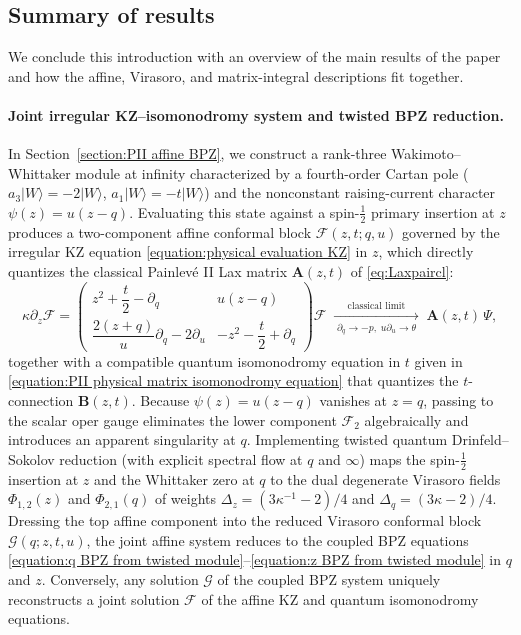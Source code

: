 \documentclass[a4paper,11pt]{article}
\newcommand{\cF}{\mathcal{F}}
\numberwithin{equation}{section}
\begin{document}
\subsection{Summary of results}
\label{subsection:summary_of_results}

We conclude this introduction with an overview of the main results of the paper and how the affine, Virasoro, and matrix-integral descriptions fit together.

\paragraph{Joint irregular KZ--isomonodromy system and twisted BPZ reduction.}
In Section~\ref{section:PII affine BPZ}, we construct a rank-three Wakimoto--Whittaker module at infinity characterized by a fourth-order Cartan pole ($a_{3}|W\rangle=-2|W\rangle$, $a_{1}|W\rangle=-t|W\rangle$) and the nonconstant raising-current character $\psi(z)=u(z-q)$.  Evaluating this state against a spin-$\frac{1}{2}$ primary insertion at $z$ produces a two-component affine conformal block $\cF(z,t;q,u)$ governed by the irregular KZ equation \eqref{equation:physical evaluation KZ} in $z$, which directly quantizes the classical Painlev\'e II Lax matrix $\mathbf{A}(z,t)$ of \eqref{eq:Laxpaircl}:
\begin{equation}
	\kappa\partial_{z}\cF
	=
	\begin{pmatrix}
		z^{2}+\dfrac{t}{2}-\partial_{q} & u(z-q)\\[2mm]
		\dfrac{2(z+q)}{u}\partial_{q}-2\partial_{u} & -z^{2}-\dfrac{t}{2}+\partial_{q}
	\end{pmatrix}\cF
	\;\xrightarrow[\;\partial_{q}\to -p,\; u\partial_{u}\to\theta\;]{\text{classical limit}}\;
	\mathbf{A}(z,t)\,\Psi,
\end{equation}
together with a compatible quantum isomonodromy equation in $t$ given in \eqref{equation:PII physical matrix isomonodromy equation} that quantizes the $t$-connection $\mathbf{B}(z,t)$.
Because $\psi(z)=u(z-q)$ vanishes at $z=q$, passing to the scalar oper gauge eliminates the lower component $\cF_{2}$ algebraically and introduces an apparent singularity at $q$.  Implementing twisted quantum Drinfeld--Sokolov reduction (with explicit spectral flow at $q$ and $\infty$) maps the spin-$\frac{1}{2}$ insertion at $z$ and the Whittaker zero at $q$ to the dual degenerate Virasoro fields $\Phi_{1,2}(z)$ and $\Phi_{2,1}(q)$ of weights $\Delta_{z}=(3\kappa^{-1}-2)/4$ and $\Delta_{q}=(3\kappa-2)/4$.  Dressing the top affine component into the reduced Virasoro conformal block $\mathcal{G}(q;z,t,u)$, the joint affine system reduces to the coupled BPZ equations \eqref{equation:q BPZ from twisted module}--\eqref{equation:z BPZ from twisted module} in $q$ and $z$.  Conversely, any solution $\mathcal{G}$ of the coupled BPZ system uniquely reconstructs a joint solution $\cF$ of the affine KZ and quantum isomonodromy equations.
\end{document}
